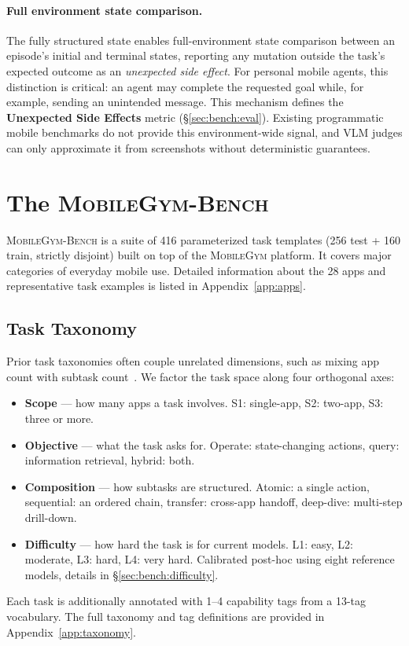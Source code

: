 \documentclass[11pt]{article}
\newcommand{\sys}{\textsc{MobileGym}}
\newcommand{\bench}{\textsc{MobileGym-Bench}}
\begin{document}
\paragraph{Full environment state comparison.} The fully structured state enables full-environment state comparison between an episode's initial and terminal states, reporting any mutation outside the task's expected outcome as an \emph{unexpected side effect}. For personal mobile agents, this distinction is critical: an agent may complete the requested goal while, for example, sending an unintended message. This mechanism defines the \textbf{Unexpected Side Effects} metric (§\ref{sec:bench:eval}). Existing programmatic mobile benchmarks do not provide this environment-wide signal, and VLM judges can only approximate it from screenshots without deterministic guarantees.

\section{The \bench{}}\label{sec:bench}

\bench{} is a suite of 416 parameterized task templates (256 test + 160 train, strictly disjoint) built on top of the \sys{} platform. It covers major categories of everyday mobile use.  Detailed information about the 28 apps and representative task examples is listed in Appendix~\ref{app:apps}.

\subsection{Task Taxonomy}\label{sec:bench:taxonomy}

Prior task taxonomies often couple unrelated dimensions, such as mixing app count with subtask count~\cite{MobileBench}. We factor the task space along four orthogonal axes:
\begin{itemize}
  \item \textbf{Scope} --- how many apps a task involves. S1: single-app, S2: two-app, S3: three or more.
  \item \textbf{Objective} --- what the task asks for. Operate: state-changing actions, query: information retrieval, hybrid: both.
  \item \textbf{Composition} --- how subtasks are structured. Atomic: a single action, sequential: an ordered chain, transfer: cross-app handoff, deep-dive: multi-step drill-down.
  \item \textbf{Difficulty} --- how hard the task is for current models. L1: easy, L2: moderate, L3: hard, L4: very hard. Calibrated post-hoc using eight reference models, details in §\ref{sec:bench:difficulty}.
\end{itemize}
Each task is additionally annotated with 1--4 capability tags from a 13-tag vocabulary. The full taxonomy and tag definitions are provided in Appendix~\ref{app:taxonomy}.
\end{document}
